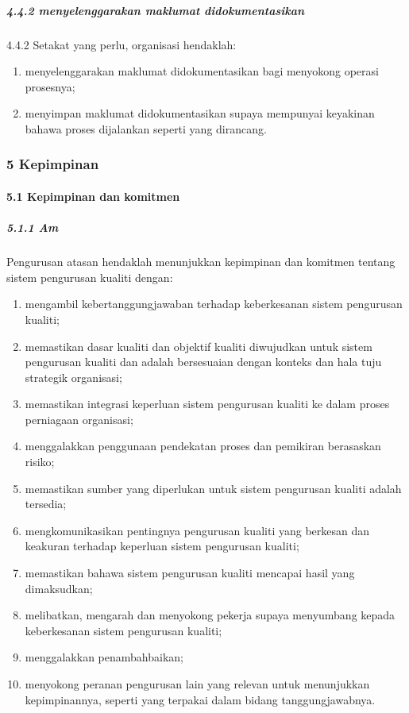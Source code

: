 \documentclass[
]{article}
\begin{document}
\hypertarget{menyelenggarakan-maklumat-didokumentasikan}{%
\subparagraph{4.4.2 menyelenggarakan maklumat
didokumentasikan}\label{menyelenggarakan-maklumat-didokumentasikan}}

4.4.2 Setakat yang perlu, organisasi hendaklah:

\begin{enumerate}
\def\labelenumi{\alph{enumi})}
\item
  menyelenggarakan maklumat didokumentasikan bagi menyokong operasi
  prosesnya;
\item
  menyimpan maklumat didokumentasikan supaya mempunyai keyakinan bahawa
  proses dijalankan seperti yang dirancang.
\end{enumerate}

\hypertarget{kepimpinan}{%
\subsubsection{5 Kepimpinan}\label{kepimpinan}}

\hypertarget{kepimpinan-dan-komitmen}{%
\paragraph{5.1 Kepimpinan dan komitmen}\label{kepimpinan-dan-komitmen}}

\hypertarget{am-1}{%
\subparagraph{5.1.1 Am}\label{am-1}}

Pengurusan atasan hendaklah menunjukkan kepimpinan dan komitmen tentang
sistem pengurusan kualiti dengan:

\begin{enumerate}
\def\labelenumi{\alph{enumi})}
\item
  mengambil kebertanggungjawaban terhadap keberkesanan sistem pengurusan
  kualiti;
\item
  memastikan dasar kualiti dan objektif kualiti diwujudkan untuk sistem
  pengurusan kualiti dan adalah bersesuaian dengan konteks dan hala tuju
  strategik organisasi;
\item
  memastikan integrasi keperluan sistem pengurusan kualiti ke dalam
  proses perniagaan organisasi;
\item
  menggalakkan penggunaan pendekatan proses dan pemikiran berasaskan
  risiko;
\item
  memastikan sumber yang diperlukan untuk sistem pengurusan kualiti
  adalah tersedia;
\item
  mengkomunikasikan pentingnya pengurusan kualiti yang berkesan dan
  keakuran terhadap keperluan sistem pengurusan kualiti;
\item
  memastikan bahawa sistem pengurusan kualiti mencapai hasil yang
  dimaksudkan;
\item
  melibatkan, mengarah dan menyokong pekerja supaya menyumbang kepada
  keberkesanan sistem pengurusan kualiti;
\item
  menggalakkan penambahbaikan;
\item
  menyokong peranan pengurusan lain yang relevan untuk menunjukkan
  kepimpinannya, seperti yang terpakai dalam bidang tanggungjawabnya.
\end{enumerate}
\end{document}
